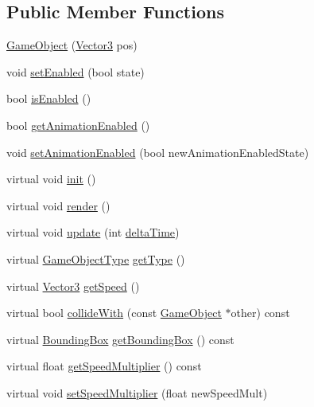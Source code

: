 \subsection*{Public Member Functions}
\begin{DoxyCompactItemize}
\item 
\hyperlink{class_game_object_ac95c474744d79fe4aadc49a100cfb9c6}{Game\+Object} (\hyperlink{class_vector3}{Vector3} pos)
\item 
void \hyperlink{class_game_object_a218c4b2970c9385f524b4cf5a13a3883}{set\+Enabled} (bool state)
\item 
bool \hyperlink{class_game_object_afd4da74521b2ba311f82b62f6ffec9e3}{is\+Enabled} ()
\item 
bool \hyperlink{class_game_object_ae3a7ab65df0dc3fb241a5a35a390fb3b}{get\+Animation\+Enabled} ()
\item 
void \hyperlink{class_game_object_a75027d1b9e11cd22111535b29ff062e0}{set\+Animation\+Enabled} (bool new\+Animation\+Enabled\+State)
\item 
virtual void \hyperlink{class_game_object_aecb2c1b9f69715d854f7604d5d7978ec}{init} ()
\item 
virtual void \hyperlink{class_game_object_a484efb66a7a27c101e84c11d9905d7a6}{render} ()
\item 
virtual void \hyperlink{class_game_object_a6dc5215a3d0efc7a9e2332006b31c868}{update} (int \hyperlink{_game_manager_8h_afea6a95c7a1c119b7106a4c735eb259d}{delta\+Time})
\item 
virtual \hyperlink{_game_object_8h_a57678b60d65afb213d04a6b090c64a08}{Game\+Object\+Type} \hyperlink{class_game_object_ab7ee421293a4bbe47b4102180185fbaa}{get\+Type} ()
\item 
virtual \hyperlink{class_vector3}{Vector3} \hyperlink{class_game_object_ac08043ba5563ecbd118e522169f7f919}{get\+Speed} ()
\item 
virtual bool \hyperlink{class_game_object_a9ab7d2e2beff3e91ccdc87c9fbca019e}{collide\+With} (const \hyperlink{class_game_object}{Game\+Object} $\ast$other) const
\item 
virtual \hyperlink{class_bounding_box}{Bounding\+Box} \hyperlink{class_game_object_a64b37bea01266aea52a47f4a48a9cc84}{get\+Bounding\+Box} () const
\item 
virtual float \hyperlink{class_game_object_a577ca32504b1551f75e1724219c4f6cf}{get\+Speed\+Multiplier} () const
\item 
virtual void \hyperlink{class_game_object_ab3d0617433250c19ccbb64bfca1bb905}{set\+Speed\+Multiplier} (float new\+Speed\+Mult)
\end{DoxyCompactItemize}
